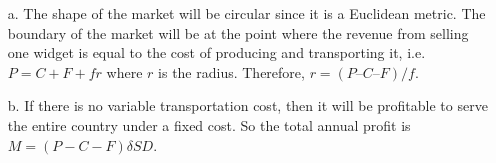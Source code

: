 \documentclass[12pt]{article}
\newcommand{\customsubsection}[1]{
  \subsection*{Problem \thesection.#1}
}
\begin{document}
\begin{itemize}
    \item [a.] The shape of the market will be circular since it is a Euclidean metric. 
    The boundary of the market will be at the point where the revenue from selling one widget is equal to the cost of producing and transporting it, i.e. $P = C + F + fr$ where $r$ is the radius. Therefore, $r = (P – C – F)/f$. 
    \item[b.] If there is no variable transportation cost, then it will be profitable to serve the entire country under a fixed cost. So the total annual profit is  $M= (P-C-F) \delta S D$. 
\end{itemize}


\newpage

\end{document}
